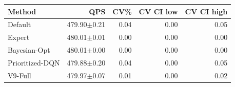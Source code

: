 \begin{tabular}{lrrrr}
\hline
Method & QPS & CV\% & CV CI low & CV CI high \\
\hline
Default & 479.90$\pm$0.21 & 0.04 & 0.00 & 0.05 \\
Expert & 480.01$\pm$0.01 & 0.00 & 0.00 & 0.00 \\
Bayesian-Opt & 480.01$\pm$0.00 & 0.00 & 0.00 & 0.00 \\
Prioritized-DQN & 479.88$\pm$0.20 & 0.04 & 0.00 & 0.05 \\
V9-Full & 479.97$\pm$0.07 & 0.01 & 0.00 & 0.02 \\
\hline
\end{tabular}